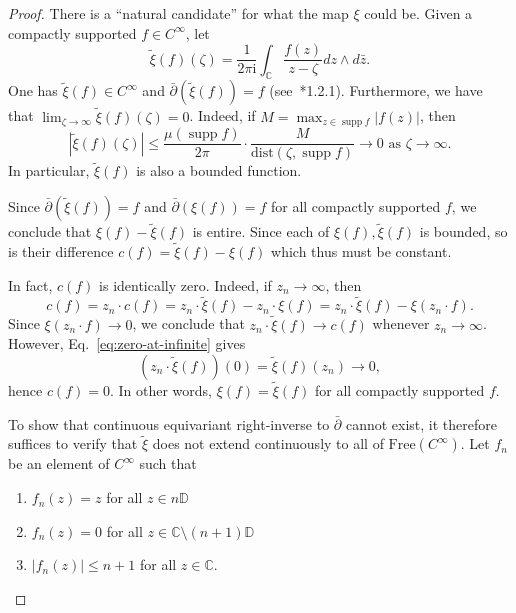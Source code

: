 \documentclass[12pt]{paper}
\numberwithin{equation}{section}
\theoremstyle{plain}
\theoremstyle{definition}
\newcommand{\C}{\mathbb{C}}
\newcommand{\D}{\mathbb{D}}
\newcommand{\im}{\mathrm{i}} %
\DeclareMathOperator*{\supp}{\mathrm{supp}}
\newcommand{\free}{\mathrm{Free}}
\newcommand{\dist}{\textrm{dist}}
\begin{document}
\begin{proof}
  There is a ``natural candidate'' for what the map \(\xi\) could be. Given a compactly supported
  \(f \in C^{\infty}\), let
  \[
    \widetilde{\xi}(f)(\zeta) = \frac{1}{2\pi \im} \int_{\C} \frac{f(z)}{z-\zeta} dz \wedge
    d\bar{z}.
  \]
  One has \(\widetilde{\xi}(f) \in C^{\infty}\) and \(\bar{\partial} (\widetilde{\xi}(f)) = f\)
  (see~\cite{hormanderIntroductionComplexAnalysis1990}*{1.2.1}).  Furthermore, we have that
  \(\lim_{\zeta \to \infty}\widetilde{\xi}(f)(\zeta) = 0\).  Indeed, if
  \(M = \max_{z \in \supp f}|f(z)|\), then
  \begin{equation}
    \label{eq:zero-at-infinite}
    |\widetilde{\xi}(f)(\zeta)| \le \frac{\mu(\supp f)}{2 \pi}  \cdot \frac{M}{\dist(\zeta, \supp
      f)} \to 0 \textrm{ as } \zeta \to \infty.
  \end{equation}
  In particular, \(\widetilde{\xi}(f)\) is also a bounded function.

  Since \(\bar{\partial}(\widetilde{\xi}(f)) = f\) and \(\bar{\partial} (\xi(f)) = f\) for all compactly
  supported \(f\), we conclude that \(\xi(f) - \widetilde{\xi}(f)\) is entire.  Since each of
  \(\xi(f), \widetilde{\xi}(f)\) is bounded, so is their difference
  \(c(f) = \widetilde{\xi}(f) - \xi(f)\) which thus must be constant.

  In fact, \(c(f) \) is identically zero.  Indeed, if \(z_{n} \to \infty\), then
  \[
    c(f) = z_{n}\cdot c(f) = z_{n} \cdot \widetilde{\xi}(f) - z_{n} \cdot \xi(f) = z_{n} \cdot
    \widetilde{\xi}(f) - \xi(z_{n} \cdot f).
  \]
  Since \(\xi(z_{n} \cdot f) \to 0\), we conclude that \(z_{n} \cdot \widetilde{\xi}(f) \to c(f)\)
  whenever \(z_{n} \to \infty\).  However, Eq.~\eqref{eq:zero-at-infinite} gives
  \[
  (z_{n} \cdot \widetilde{\xi}(f))(0) = \widetilde{\xi}(f)(z_{n}) \to 0,
  \]
  hence \(c(f) = 0\). In other words, \(\xi(f) = \widetilde{\xi}(f)\) for all compactly supported \(f\).

  To show that continuous equivariant right-inverse to \(\bar{\partial}\) cannot exist, it therefore
  suffices to verify that \(\widetilde{\xi}\) does not extend continuously to all of
  \(\free(C^{\infty})\).  Let \(f_{n}\) be an element of \(C^{\infty}\) such that
  \begin{enumerate}[leftmargin=1cm, label={\sf \arabic*}., ref={\sf \arabic*}]
  \item \(f_{n}(z) = z\) for all \(z \in n\D\)
  \item \(f_{n}(z) = 0\) for all \(z \in \C \setminus (n+1) \D\)
  \item \(|f_{n}(z)| \le n+1\) for all \(z \in \C\).
  \end{enumerate}


\end{proof}
\end{document}
